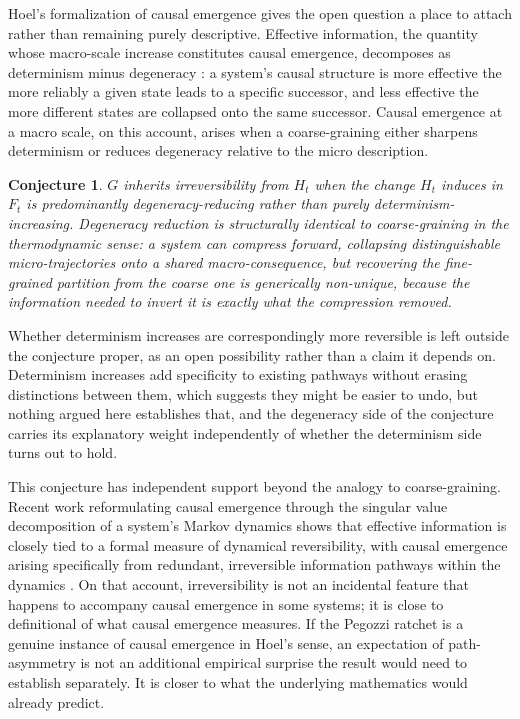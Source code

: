 \documentclass[11pt]{article}
\newtheorem{conjecture}{Conjecture}[section]
\begin{document}
Hoel's formalization of causal emergence gives the open question a place to attach rather than remaining purely descriptive. Effective information, the quantity whose macro-scale increase constitutes causal emergence, decomposes as determinism minus degeneracy \cite{hoel2013, hoel2017}: a system's causal structure is more effective the more reliably a given state leads to a specific successor, and less effective the more different states are collapsed onto the same successor. Causal emergence at a macro scale, on this account, arises when a coarse-graining either sharpens determinism or reduces degeneracy relative to the micro description.

\begin{conjecture}
$G$ inherits irreversibility from $H_t$ when the change $H_t$ induces in $F_t$ is predominantly degeneracy-reducing rather than purely determinism-increasing. Degeneracy reduction is structurally identical to coarse-graining in the thermodynamic sense: a system can compress forward, collapsing distinguishable micro-trajectories onto a shared macro-consequence, but recovering the fine-grained partition from the coarse one is generically non-unique, because the information needed to invert it is exactly what the compression removed.
\end{conjecture}

Whether determinism increases are correspondingly more reversible is left outside the conjecture proper, as an open possibility rather than a claim it depends on. Determinism increases add specificity to existing pathways without erasing distinctions between them, which suggests they might be easier to undo, but nothing argued here establishes that, and the degeneracy side of the conjecture carries its explanatory weight independently of whether the determinism side turns out to hold.

This conjecture has independent support beyond the analogy to coarse-graining. Recent work reformulating causal emergence through the singular value decomposition of a system's Markov dynamics shows that effective information is closely tied to a formal measure of dynamical reversibility, with causal emergence arising specifically from redundant, irreversible information pathways within the dynamics \cite{zhang2025}. On that account, irreversibility is not an incidental feature that happens to accompany causal emergence in some systems; it is close to definitional of what causal emergence measures. If the Pegozzi ratchet is a genuine instance of causal emergence in Hoel's sense, an expectation of path-asymmetry is not an additional empirical surprise the result would need to establish separately. It is closer to what the underlying mathematics would already predict.
\end{document}
